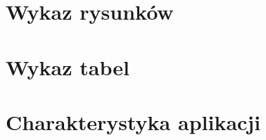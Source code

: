 \documentclass[a4paper, twoside, 11pt, openright]{article}
\begin{document}
\section{Wykaz rysunków}

\section{Wykaz tabel}

\section{Charakterystyka aplikacji}
\end{document}
